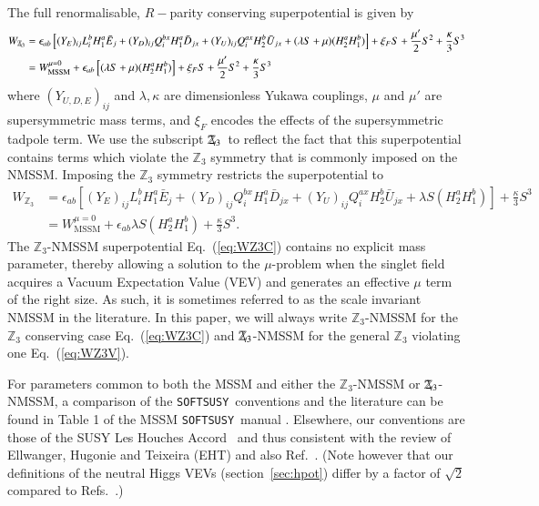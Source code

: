 \documentclass[final,3p,times,pdflatex]{elsarticle}
\def\SOFTSUSY{{\tt SOFTSUSY}}
\newcommand{\Zv}{\,\mathbf{\backslash}\mkern-11.0mu{\mathbb{Z}}_{3}} %
\begin{document}
The full renormalisable, $R-$parity conserving superpotential is given by
%
\begin{align} 
 W_{\Zv}  &=  \epsilon_{ab} \left[ (Y_E)_{ij} L_i^b H_1^a \bar{E}_{j} 
+ (Y_D)_{ij} Q_i^{bx} H_1^a \bar{D}_{jx} 
+ (Y_U)_{ij} Q_i^{ax} H_2^b \bar{U}_{jx} 
+ (\lambda S + \mu)(H^a_2 H^b_1) \right]  + \xi_FS 
+ \frac{\mu^\prime}{2} S^{2} + \frac{\kappa}{3}S^{3} \\
%
&= W_\mathrm{MSSM}^{\mu =0} 
+ \epsilon_{ab}\left[ (\lambda S + \mu)(H^a_2 H^b_1) \right]  
+ \xi_FS + \frac{\mu^\prime}{2}S^{2} + \frac{\kappa}{3} S^{3} \,
\label{eq:WZ3V}
\end{align}
%
\noindent where $(Y_{U,D,E})_{ij}$ and $\lambda,\kappa$ are dimensionless Yukawa 
couplings, $\mu$ and $\mu'$ are supersymmetric mass terms, and $\xi_F$ encodes 
the effects of the supersymmetric tadpole term.  We use
the subscript $\Zv$~to reflect the fact that this superpotential 
contains terms which violate the $\mathbb{Z}_3$ symmetry that is commonly 
imposed on the NMSSM.  Imposing the $\mathbb{Z}_3$ symmetry restricts the 
superpotential to
%
\begin{align} 
 W_{\mathbb{Z}_3} &= \epsilon_{ab} \left[(Y_E)_{ij} L_i^b H_1^a \bar{E}_{j} 
+ (Y_D)_{ij} Q_i^{bx} H_1^a \bar{D}_{jx} + (Y_U)_{ij} Q_i^{ax} H_2^b \bar{U}_{jx}  
+ \lambda S(H^a_2 H^b_1) \right] + \frac{\kappa}{3}S^{3} \\
%
&= W_\mathrm{MSSM}^{\mu =0}  + \epsilon_{ab} \lambda S (H^a_2 H^b_1) 
+ \frac{\kappa}{3}S^{3}.
\label{eq:WZ3C}
\end{align}
%
\noindent The $\mathbb{Z}_3$-NMSSM superpotential Eq.~(\ref{eq:WZ3C}) contains no 
explicit mass parameter, thereby allowing a solution to the $\mu$-problem when 
the singlet field acquires a Vacuum Expectation Value (VEV) and generates an 
effective $\mu$ term of the right size. As such, it is sometimes referred to as 
the scale invariant NMSSM in the literature.  In this paper, we will always 
write $\mathbb{Z}_3$-NMSSM for the $\mathbb{Z}_3$ conserving case 
Eq.~(\ref{eq:WZ3C}) and $\Zv$-NMSSM for the general $\mathbb{Z}_3$ violating one 
Eq.~(\ref{eq:WZ3V}). 

For parameters common to both the MSSM and either the $\mathbb{Z}_3$-NMSSM or 
$\Zv$-NMSSM, a comparison of the \SOFTSUSY~conventions and the literature can be 
found in Table 1 of the MSSM \SOFTSUSY~manual \cite{Allanach:2001kg}.  Elsewhere, 
our conventions are those of the SUSY Les Houches Accord~\cite{Allanach:2008qq} 
and thus consistent with the review of Ellwanger, Hugonie and Teixeira (EHT) 
 \cite{Ellwanger:2009dp} and also Ref.~\cite{Degrassi:2009yq}. (Note however that 
our definitions of the neutral Higgs VEVs (section~\ref{sec:hpot}) differ by a 
factor of $\sqrt{2}$ compared to Refs.~\cite{Ellwanger:2009dp,Degrassi:2009yq}.)
\end{document}
